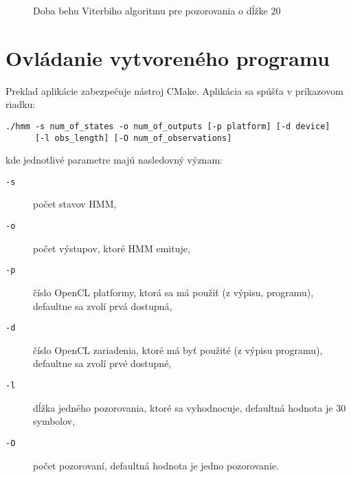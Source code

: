 \documentclass[11pt,a4paper]{article}
\begin{document}
\begin{figure}[!ht]
  \centering
  \caption{Doba behu Viterbiho algoritmu pre pozorovania o dĺžke 20} \label{viterbi-elapsed-time}
\end{figure}





\section{Ovládanie vytvoreného programu}

Preklad aplikácie zabezpečuje nástroj CMake. Aplikácia sa spúšťa v príkazovom
riadku:

\begin{verbatim}
./hmm -s num_of_states -o num_of_outputs [-p platform] [-d device]
      [-l obs_length] [-O num_of_observations]
\end{verbatim}

\noindent kde jednotlivé parametre majú nasledovný význam:

\begin{description}
  \item[\texttt{-s}] počet stavov HMM,
  \item[\texttt{-o}] počet výstupov, ktoré HMM emituje,
  \item[\texttt{-p}] číslo OpenCL platformy, ktorá sa má použiť (z výpisu, programu), defaultne sa zvolí prvá dostupná,
  \item[\texttt{-d}] číslo OpenCL zariadenia, ktoré má byť použité (z výpisu programu), defaultne sa zvolí prvé dostupné,
  \item[\texttt{-l}] dĺžka jedného pozorovania, ktoré sa vyhodnocuje, defaultná hodnota je 30 symbolov,
  \item[\texttt{-O}] počet pozorovaní, defaultná hodnota je jedno pozorovanie.
\end{description}
\end{document}
